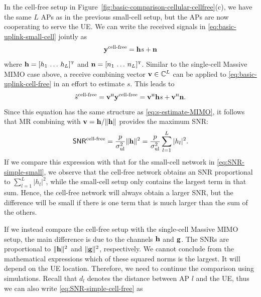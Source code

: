 In the cell-free setup in Figure~\ref{fig:basic-comparison-cellular-cellfree}(c), we have the same $L$ \glspl{AP} as in the previous small-cell setup, but the \glspl{AP} are now cooperating to serve the \gls{UE}. We can write the received signals in \eqref{eq:basic-uplink-small-cell} jointly as
\begin{equation} \label{eq:basic-uplink-cell-free}
\mathbf{y}^{\textrm{cell-free}} = \mathbf{h} s + \mathbf{n}
\end{equation}
where $\vect{h} = [ h_1 \, \ldots \, h_L ]^{\Ttran}$ and $\vect{n} = [ n_1 \, \ldots \, n_L ]^{\Ttran}$.
Similar to the single-cell Massive \gls{MIMO} case above, a receive combining vector $\mathbf{v} \in \mathbb{C}^L$ can be applied to \eqref{eq:basic-uplink-cell-free} in an effort to estimate $s$. This leads to
\begin{equation}
\hat{s}^{\textrm{cell-free}}  = \vect{v}^{\Htran} \vect{y}^{\textrm{cell-free}}   =  \vect{v}^{\Htran} \vect{h} s + \vect{v}^{\Htran}\vect{n}.
\end{equation}
Since this equation has the same structure as \eqref{eq:s-estimate-MIMO}, it follows that \gls{MR} combining with $\mathbf{v} = \mathbf{h} / \| \mathbf{h} \|$ provides the maximum \gls{SNR}:
\begin{equation} \label{eq:SNR-simple-cell-free}
\mathsf{SNR}^{\textrm{cell-free}}  = \frac{p}{\sigma^2_{\mathrm{ul}}} \| \mathbf{h}\|^2 =  \frac{p}{\sigma^2_{\mathrm{ul}}}\sum_{l=1}^L  |h_l|^2.
\end{equation}
If we compare this expression with that for the small-cell network in \eqref{eq:SNR-simple-small}, we observe that the cell-free network obtains an \gls{SNR} proportional to $\sum_{l=1}^L  |h_l|^2$, while the small-cell setup only contains the largest term in that sum.
Hence, the cell-free network will always obtain a larger \gls{SNR}, but the difference will be small if there is one term that is much larger than the sum of the others.

\enlargethispage{\baselineskip} 

If we instead compare the cell-free setup with the single-cell Massive \gls{MIMO} setup, the main difference is due to the channels $\mathbf{h}$ and $\mathbf{g}$. The \glspl{SNR} are proportional to $\| \mathbf{h}\|^2$ and $\| \mathbf{g}\|^2$, respectively. We cannot conclude from the mathematical expressions which of these squared norms is the largest. It will depend on the \gls{UE} location. Therefore, we need to continue the comparison using simulations. Recall that $d_l$ denotes the distance between \gls{AP} $l$ and the \gls{UE}, thus we can also write \eqref{eq:SNR-simple-cell-free} as
 
